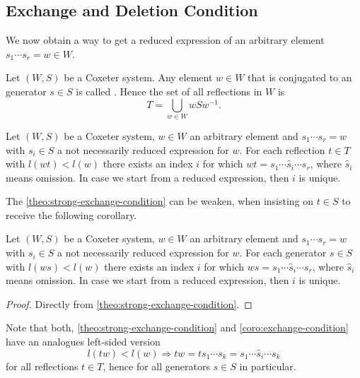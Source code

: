 \subsection{Exchange and Deletion Condition}
\label{sec:coxeter-groups-exchange-deletion-condition}

We now obtain a way to get a reduced expression of an arbitrary element $s_1 \cdots s_r = w \in W$.

\begin{defi}
	Let $(W,S)$ be a Coxeter system. Any element $w \in W$ that is conjugated to an generator $s \in S$ is called . Hence the set of all reflections in $W$ is
	$$ T = \bigcup_{w \in W} wSw^{-1}. $$
\end{defi}

\begin{theo}
	Let $(W,S)$ be a Coxeter system, $w \in W$ an arbitrary element and ${s_1 \cdots s_r = w}$ with $s_i \in S$ a not necessarily reduced expression for $w$. For each reflection $t \in T$ with $l(wt) < l(w)$ there exists an index $i$ for which $wt = s_1 \cdots \hat s_i \cdots s_r$, where $\hat s_i$ means omission. In case we start from a reduced expression, then $i$ is unique.
\end{theo}

The \ref{theo:strong-exchange-condition} can be weaken, when insisting on $t \in S$ to receive the following corollary.

\begin{coro}
	Let $(W,S)$ be a Coxeter system, $w \in W$ an arbitrary element and ${s_1 \cdots s_r = w}$ with $s_i \in S$ a not necessarily reduced expression for $w$. For each generator $s \in S$ with $l(ws) < l(w)$ there exists an index $i$ for which $ws = s_1 \cdots \hat s_i \cdots s_r$, where $\hat s_i$ means omission. In case we start from a reduced expression, then $i$ is unique.

	\begin{proof}
		Directly from \ref{theo:strong-exchange-condition}.
	\end{proof}
\end{coro}

\begin{rema}
	Note that both, \ref{theo:strong-exchange-condition} and \ref{coro:exchange-condition} have an analogues left-sided version
	$$ l(tw) < l(w) \Rightarrow tw = t s_1 \cdots s_k = s_1 \cdots \hat s_i \cdots s_k $$
	for all reflections $t \in T$, hence for all generators $s \in S$ in particular.
\end{rema}

